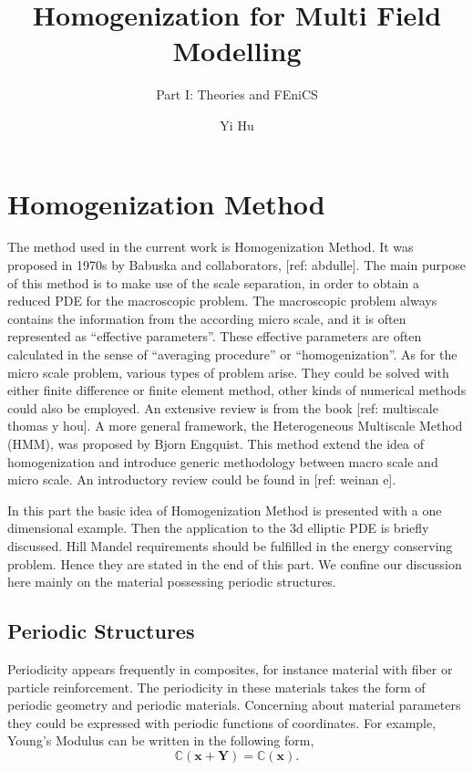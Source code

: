 \documentclass[10pt,a4paper]{scrreprt}
\author{Yi Hu}
\title{Homogenization for Multi Field Modelling}
\subtitle{Part I: Theories and FEniCS}
\begin{document}
\chapter{Homogenization Method}
The method used in the current work is Homogenization Method. It was proposed in 1970s by Babuska and collaborators, [ref: abdulle]. The main purpose of this method is to make use of the scale separation, in order to obtain a reduced PDE for the macroscopic problem. The macroscopic problem always contains the information from the according micro scale, and it is often represented as ``effective parameters''. These effective parameters are often calculated in the sense of ``averaging procedure'' or ``homogenization''. As for the micro scale problem, various types of problem arise. They could be solved with either finite difference or finite element method, other kinds of numerical methods could also be employed. An extensive review is from the book [ref: multiscale thomas y hou]. A more general framework, the Heterogeneous Multiscale Method (HMM), was proposed by Bjorn Engquist. This method extend the idea of homogenization and introduce generic methodology between macro scale and micro scale. An introductory review could be found in [ref: weinan e].

In this part the basic idea of Homogenization Method is presented with a one dimensional example. Then the application to the 3d elliptic PDE is briefly discussed. Hill Mandel requirements should be fulfilled in the energy conserving problem. Hence they are stated in the end of this part. We confine our discussion here mainly on the material possessing periodic structures. 

\section{Periodic Structures}
Periodicity appears frequently in composites, for instance material with fiber or particle reinforcement. The periodicity in these materials takes the form of periodic geometry and periodic materials. Concerning about material parameters they could be expressed with periodic functions of coordinates. For example, Young's Modulus can be written in the following form,
%
\begin{equation}
\label{eq:periodic 1}
\mathbb{C}(\mathbf{x}+\mathbf{Y}) = \mathbb{C}(\mathbf{x}).
\end{equation}
%
\end{document}

